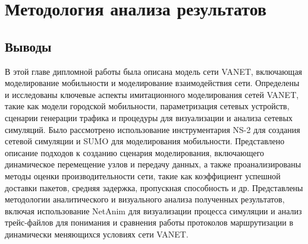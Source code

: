 



\section{Методология анализа результатов}



\subsection*{Выводы}

В этой главе дипломной работы была описана модель сети VANET, включающая моделирование мобильности и моделирование взаимодействия сети. Определены и исследованы ключевые аспекты имитационного моделирования сетей VANET, такие как модели городской мобильности, параметризация сетевых устройств, сценарии генерации трафика и процедуры для визуализации и анализа сетевых симуляций. Было рассмотрено использование инструментария NS-2 для создания сетевой симуляции и SUMO для моделирования мобильности. Представлено описание подходов к созданию сценария моделирования, включающего динамическое перемещение узлов и передачу данных, а также проанализированы методы оценки производительности сети, такие как коэффициент успешной доставки пакетов, средняя задержка, пропускная способность и др. Представлены методологии аналитического и визуального анализа полученных результатов, включая использование NetAnim для визуализации процесса симуляции и анализ трейс-файлов для понимания и сравнения работы протоколов маршрутизации в динамически меняющихся условиях сети VANET.
